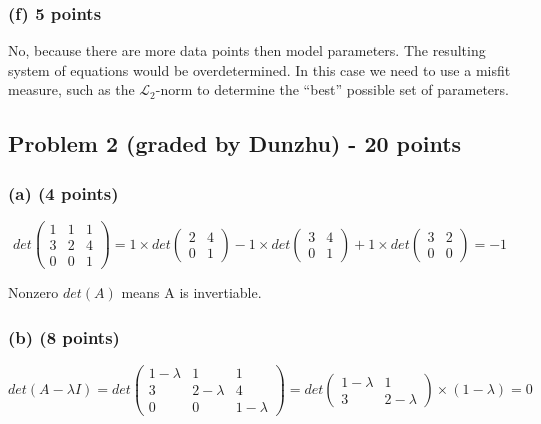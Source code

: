 \documentclass[11pt]{article}
\begin{document}
\subsubsection*{(f) 5 points}
No, because there are more data points then model parameters. The resulting system of equations would be overdetermined. In this case we need to use a misfit measure, such as the $\mathcal{L}_2$-norm to determine the ``best'' possible set of parameters.

\newpage

\subsection*{Problem 2 (graded by Dunzhu) - 20 points}
\subsubsection*{(a) (4 points)}
\begin{equation*}
det
\begin{pmatrix}
1 & 1 & 1 \\ 3 & 2 &4 \\ 0 & 0 &1
\end{pmatrix} = 
1 \times 
det
\begin{pmatrix}
2 &4 \\ 0 &1
\end{pmatrix}
-1 \times 
det
\begin{pmatrix}
3 &4 \\ 0 &1
\end{pmatrix}
+1 \times 
det
\begin{pmatrix}
3 &2 \\ 0 &0
\end{pmatrix} = -1
\end{equation*}

Nonzero  $det(A)$ means A is invertiable. 

\subsubsection*{(b) (8 points)}
\begin{equation*}
det ( A - \lambda I ) = det 
\begin{pmatrix}
1-\lambda & 1 & 1 \\ 3 & 2-\lambda &4 \\ 0 & 0 &1-\lambda
\end{pmatrix} = 
det
\begin{pmatrix}
1-\lambda & 1  \\ 3 & 2-\lambda
\end{pmatrix} \times (1-\lambda) = 0  
\end{equation*}
\end{document}
